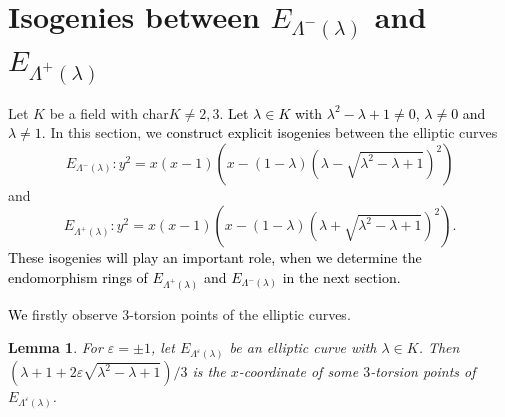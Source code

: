 \documentclass[a4paper, 11pt]{article}
\theoremstyle{plain}
\newtheorem{lem}[defn]{Lemma}
\newcommand{\?}{\textcolor{red}{??}}
\newcommand{\lm}{\lambda}
\newcommand{\Lm}{\Lambda}
\begin{document}
\section{Isogenies between $E_{\Lm^{-}(\lm)}$ and $E_{\Lm^{+}(\lm)}$}
\label{isogeniesbetweenElaElad}
Let $K$ be a field with char$K\ne 2,3$. 
\textcolor{black}{Let $\lambda\in K$
with $\lm^2-\lm+1\ne 0$, $\lm\ne 0$ and $\lm \ne 1$.}
In this section, we \textcolor{black}{construct explicit isogenies} between the elliptic curves  
\[
E_{\Lambda^{-}(\lm)}:y^2=x(x-1)\left(x-(1-\lm)(\lm-\sqrt{{\lm}^2-\lm+1} )^2 \right)
\]
and
\[
E_{{\Lambda^{+}(\lm)}}:y^2=x(x-1)\left(x-(1-\lm)(\lm+\sqrt{{\lm}^2-\lm+1})^2 \right).
\]
\textcolor{black}{These isogenies will play an important role, when we determine the endomorphism rings of $E_{\Lambda^{+}(\lm)}$ and $E_{\Lambda^{-}(\lm)}$ in the next section.} 

\textcolor{black}{We} firstly observe $3$-torsion points of the elliptic curves.
\begin{lem}
\label{x-three}
  For $\varepsilon=\pm1$, let $E_{\Lambda^{\varepsilon}(\lm)}$ be an elliptic curve with $\lm \in K$. Then
$(\lm+1+2\varepsilon\sqrt{{\lm}^2-\lm+1})/3$
   is the $x$-coordinate of some $3$-torsion points of $E_{\Lambda^{\varepsilon}(\lm)}$.
\end{lem}
\end{document}
